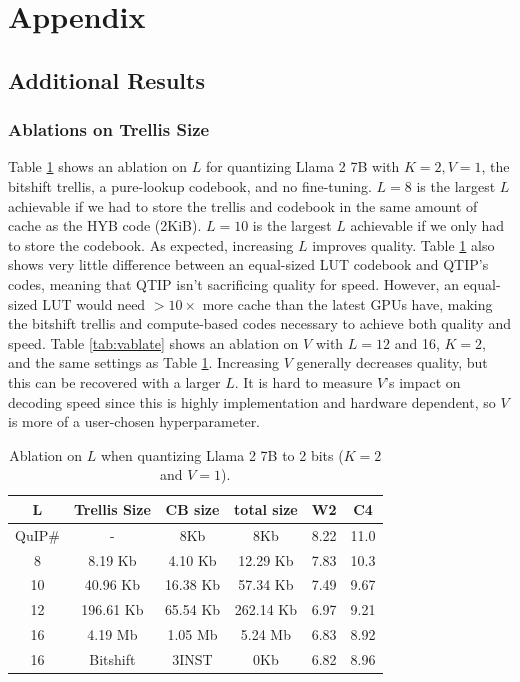 \section{Appendix}
\FloatBarrier
\subsection{Additional Results}

\subsubsection{Ablations on Trellis Size}

Table \ref{tab:lablate} shows an ablation on $L$ for quantizing Llama 2 7B with $K=2, V=1$, the bitshift trellis, a pure-lookup codebook, and no fine-tuning. $L=8$ is the largest $L$ achievable if we had to store the trellis and codebook in the same amount of cache as the HYB code (2KiB). $L=10$ is the largest $L$ achievable if we only had to store the codebook. As expected, increasing $L$ improves quality. Table \ref{tab:lablate} also shows very little difference between an equal-sized LUT codebook and QTIP’s codes, meaning that QTIP isn't sacrificing quality for speed. However, an equal-sized LUT would need $>10\times$ more cache than the latest GPUs have, making the bitshift trellis and compute-based codes necessary to achieve both quality and speed.
Table \ref{tab:vablate} shows an ablation on $V$ with $L=12$ and 16, $K=2$, and the same settings as Table \ref{tab:lablate}. Increasing $V$ generally decreases quality, but this can be recovered with a larger $L$. It is hard to measure $V$'s impact on decoding speed since this is highly implementation and hardware dependent, so $V$ is more of a user-chosen hyperparameter.

\begin{table}[h]
\centering
\caption{Ablation on $L$ when quantizing Llama 2 7B to 2 bits ($K=2$ and $V=1$).}
\label{tab:lablate}
\begin{tabular}{@{}cccccc@{}}
\toprule
L     & Trellis Size & CB size  & total size & W2   & C4   \\ \midrule
QuIP\# & -            & 8Kb      & 8Kb        & 8.22 & 11.0 \\
8     & 8.19 Kb      & 4.10 Kb  & 12.29 Kb   & 7.83 & 10.3 \\
10    & 40.96 Kb     & 16.38 Kb & 57.34 Kb   & 7.49 & 9.67 \\
12    & 196.61 Kb    & 65.54 Kb & 262.14 Kb  & 6.97 & 9.21 \\
16    & 4.19 Mb      & 1.05 Mb  & 5.24 Mb    & 6.83 & 8.92 \\
16    & Bitshift     & 3INST    & 0Kb        & 6.82 & 8.96 \\ \bottomrule
\end{tabular}
\end{table}

